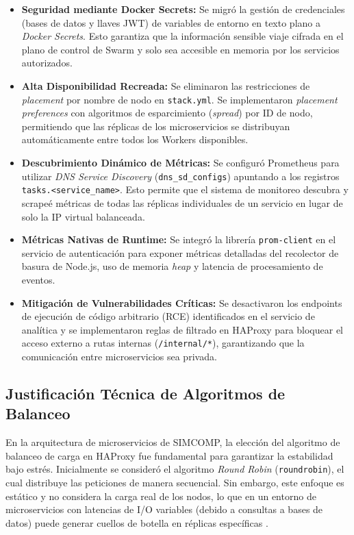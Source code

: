 \documentclass[conference]{IEEEtran}
\begin{document}
\begin{itemize}
    \item \textbf{Seguridad mediante Docker Secrets:} Se migró la gestión de credenciales (bases de datos y llaves JWT) de variables de entorno en texto plano a \textit{Docker Secrets}. Esto garantiza que la información sensible viaje cifrada en el plano de control de Swarm y solo sea accesible en memoria por los servicios autorizados.
    \item \textbf{Alta Disponibilidad Recreada:} Se eliminaron las restricciones de \textit{placement} por nombre de nodo en \texttt{stack.yml}. Se implementaron \textit{placement preferences} con algoritmos de esparcimiento (\textit{spread}) por ID de nodo, permitiendo que las réplicas de los microservicios se distribuyan automáticamente entre todos los Workers disponibles.
    \item \textbf{Descubrimiento Dinámico de Métricas:} Se configuró Prometheus para utilizar \textit{DNS Service Discovery} (\texttt{dns\_sd\_configs}) apuntando a los registros \texttt{tasks.<service\_name>}. Esto permite que el sistema de monitoreo descubra y scrapeé métricas de todas las réplicas individuales de un servicio en lugar de solo la IP virtual balanceada.
    \item \textbf{Métricas Nativas de Runtime:} Se integró la librería \texttt{prom-client} en el servicio de autenticación para exponer métricas detalladas del recolector de basura de Node.js, uso de memoria \textit{heap} y latencia de procesamiento de eventos.
    \item \textbf{Mitigación de Vulnerabilidades Críticas:} Se desactivaron los endpoints de ejecución de código arbitrario (RCE) identificados en el servicio de analítica y se implementaron reglas de filtrado en HAProxy para bloquear el acceso externo a rutas internas (\texttt{/internal/*}), garantizando que la comunicación entre microservicios sea privada.
\end{itemize}

\subsection{Justificación Técnica de Algoritmos de Balanceo}
En la arquitectura de microservicios de SIMCOMP, la elección del algoritmo de balanceo de carga en HAProxy fue fundamental para garantizar la estabilidad bajo estrés. Inicialmente se consideró el algoritmo \textit{Round Robin} (\texttt{roundrobin}), el cual distribuye las peticiones de manera secuencial. Sin embargo, este enfoque es estático y no considera la carga real de los nodos, lo que en un entorno de microservicios con latencias de I/O variables (debido a consultas a bases de datos) puede generar cuellos de botella en réplicas específicas \cite{b4}.
\end{document}
